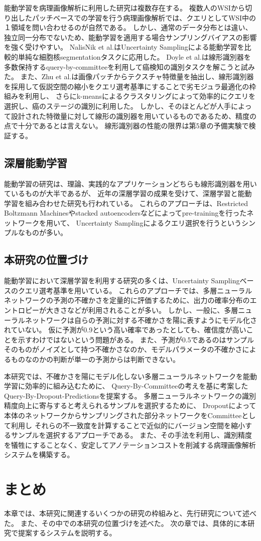 能動学習を病理画像解析に利用した研究は複数存在する。
複数人のWSIから切り出したパッチベースでの学習を行う病理画像解析では、クエリとしてWSI中の１領域を問い合わせるのが自然である。
しかし、通常のデータ分布とは違い、独立同一分布でないため、能動学習を適用する場合サンプリングバイアスの影響を強く受けやすい。
NalisNik et al.はUncertainty Samplingによる能動学習を比較的単純な細胞核segmentationタスクに応用した\cite{nalisnik2017interactive}。
Doyle et al.は線形識別器を多数保持するquery-by-committeeを利用して癌検知の識別タスクを解こうと試みた\cite{doyle2011active}。
また、Zhu et al.は画像パッチからテクスチャ特徴量を抽出し、線形識別器を採用して仮説空間の縮小をクエリ選考基準にすることで劣モジュラ最適化の枠組みを利用し、
さらにk-meansによるクラスタリングによって効率的にクエリを選択し、癌のステージの識別に利用した\cite{zhu2014scalable}。
しかし、そのほとんどが人手によって設計された特徴量に対して線形の識別器を用いているものであるため、精度の点で十分であるとは言えない。
線形識別器の性能の限界は第5章の予備実験で検証する。

\subsection{深層能動学習}
能動学習の研究は、理論、実践的なアプリケーションどちらも線形識別器を用いているものが大半であるが、
近年の深層学習の成果を受けて、深層学習と能動学習を組み合わせた研究も行われている\cite{6889457, li2016active}。
これらのアプローチは、Restricted Boltzmann Machinesやstacked autoencodersなどによってpre-trainingを行ったネットワークを用いて、
Uncertainty Samplingによるクエリ選択を行うというシンプルなものが多い。


\subsection{本研究の位置づけ}
能動学習において深層学習を利用する研究の多くは、Uncertainty Samplingベースのクエリ選考基準を用いている。
これらのアプローチでは、多層ニューラルネットワークの予測の不確かさを定量的に評価するために、出力の確率分布のエントロピーが大きさなどが利用されることが多い。
しかし、一般に、多層ニューラルネットワークは自らの予測に対する不確かさを陽に表すようにモデル化されていない。
仮に予測が0.9という高い確率であったとしても、確信度が高いことを示すわけではないという問題がある。
また、予測が0.5であるのはサンプルそのものがノイズとして持つ不確かさなのか、モデルパラメータの不確かさによるものなのかの判断が単一の予測からは判断できない。

本研究では、不確かさを陽にモデル化しない多層ニューラルネットワークを能動学習に効率的に組み込むために、
Query-By-Committeeの考えを基に考案したQuery-By-Dropout-Predictionsを提案する。
多層ニューラルネットワークの識別精度向上に寄与すると考えられるサンプルを選択するために、
Dropoutによって本体のネットワークからサンプリングされた部分ネットワークをCommitteeとして利用し
それらの不一致度を計算することで近似的にバージョン空間を縮小するサンプルを選択するアプローチである。
また、その手法を利用し、識別精度を犠牲にすることなく、安定してアノテーションコストを削減する病理画像解析システムを構築する。

\section{まとめ}
本章では、本研究に関連するいくつかの研究の枠組みと、先行研究について述べた。
また、その中での本研究の位置づけを述べた。
次の章では、具体的に本研究で提案するシステムを説明する。